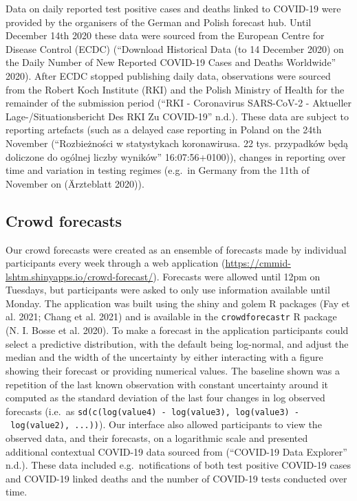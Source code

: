 \documentclass[
]{article}
\begin{document}
Data on daily reported test positive cases and deaths linked to COVID-19 were provided by the organisers of the German and Polish forecast hub. Until December 14th 2020 these data were sourced from the European Centre for Disease Control (ECDC) ({``Download Historical Data (to 14 {December} 2020) on the Daily Number of New Reported {COVID}-19 Cases and Deaths Worldwide''} 2020). After ECDC stopped publishing daily data, observations were sourced from the Robert Koch Institute (RKI) and the Polish Ministry of Health for the remainder of the submission period ({``{RKI} - {Coronavirus SARS}-{CoV}-2 - {Aktueller Lage}-/{Situationsbericht} Des {RKI} Zu {COVID}-19''} n.d.). These data are subject to reporting artefacts (such as a delayed case reporting in Poland on the 24th November ({``Rozbieżności w statystykach koronawirusa. 22 tys. przypadków będą doliczone do ogólnej liczby wyników''} 16:07:56+0100)), changes in reporting over time and variation in testing regimes (e.g.~in Germany from the 11th of November on (Ärzteblatt 2020)).

\hypertarget{crowd-forecasts}{%
\subsection{Crowd forecasts}\label{crowd-forecasts}}

Our crowd forecasts were created as an ensemble of forecasts made by individual participants every week through a web application (\url{https://cmmid-lshtm.shinyapps.io/crowd-forecast/}). Forecasts were allowed until 12pm on Tuesdays, but participants were asked to only use information available until Monday. The application was built using the shiny and golem R packages (Fay et al. 2021; Chang et al. 2021) and is available in the \texttt{crowdforecastr} R package (N. I. Bosse et al. 2020). To make a forecast in the application participants could select a predictive distribution, with the default being log-normal, and adjust the median and the width of the uncertainty by either interacting with a figure showing their forecast or providing numerical values. The baseline shown was a repetition of the last known observation with constant uncertainty around it computed as the standard deviation of the last four changes in log observed forecasts (i.e.~as \texttt{sd(c(log(value4)\ -\ log(value3),\ log(value3)\ -\ log(value2),\ ...))}).
Our interface also allowed participants to view the observed data, and their forecasts, on a logarithmic scale and presented additional contextual COVID-19 data sourced from ({``{COVID}-19 {Data Explorer}''} n.d.). These data included e.g.~notifications of both test positive COVID-19 cases and COVID-19 linked deaths and the number of COVID-19 tests conducted over time.
\end{document}
